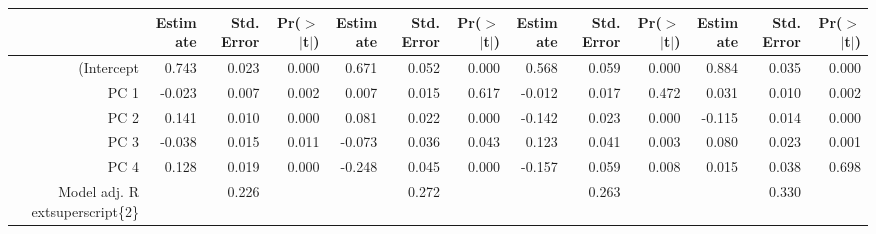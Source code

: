 \begin{table}[ht]
\centering
\begin{tabular}{rrrrrrrrrrrrr}
  \hline
 & Estimate & Std. Error & Pr($>$$|$t$|$) & Estimate & Std. Error & Pr($>$$|$t$|$) & Estimate & Std. Error & Pr($>$$|$t$|$) & Estimate & Std. Error & Pr($>$$|$t$|$) \\ 
  \hline
(Intercept & 0.743 & 0.023 & 0.000 & 0.671 & 0.052 & 0.000 & 0.568 & 0.059 & 0.000 & 0.884 & 0.035 & 0.000 \\ 
  PC 1 & -0.023 & 0.007 & 0.002 & 0.007 & 0.015 & 0.617 & -0.012 & 0.017 & 0.472 & 0.031 & 0.010 & 0.002 \\ 
  PC 2 & 0.141 & 0.010 & 0.000 & 0.081 & 0.022 & 0.000 & -0.142 & 0.023 & 0.000 & -0.115 & 0.014 & 0.000 \\ 
  PC 3 & -0.038 & 0.015 & 0.011 & -0.073 & 0.036 & 0.043 & 0.123 & 0.041 & 0.003 & 0.080 & 0.023 & 0.001 \\ 
  PC 4 & 0.128 & 0.019 & 0.000 & -0.248 & 0.045 & 0.000 & -0.157 & 0.059 & 0.008 & 0.015 & 0.038 & 0.698 \\ 
  Model adj. R	extsuperscript\{2\} &  & 0.226 &  &  & 0.272 &  &  & 0.263 &  &  & 0.330 &  \\ 
   \hline
\end{tabular}
\end{table}

